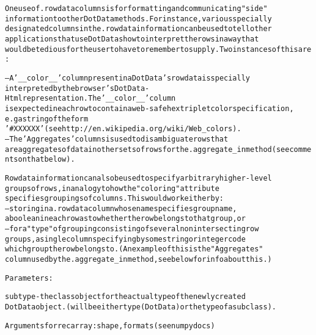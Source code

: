 \begin{boxedminipage}{\funcwidth}
\begin{alltt}
     One use of .rowdata columns is for formatting and communicating "side" 
     information to other DotData methods. For instance, various specially 
     designated columns in the .rowdata information can be used to tell other 
     applications that use DotDatas how to interpret the rows in a way that
     would be tedious for the user to have to remember to supply. Two instances of this are:
             
     -- A '\_\_color\_\_' column present in a DotData's rowdata is specially 
     interpreted by the browser's DotData- Html representation. The '\_\_color\_\_' column
     is expected in each row to contain a web-safe hex triplet color specification, 
     e.g a string of the form
             '\#XXXXXX' (see http://en.wikipedia.org/wiki/Web\_colors).  
     -- The 'Aggregates' columns is used to disambiguate rows that 
     are aggregates of data in other sets of rows for the .aggregate\_in method (see comments on that below). 
     
     Rowdata information can also be used to specify arbitrary higher-level 
     groups of rows, in analogy to how the "coloring" attribute 
     specifies groupings of columns.   This would work either by: 
             -- storing in a .rowdata column whose name specifies group name,
                     a boolean in each row as to whether the row belongs to that group, or
             -- for a "type" of grouping consisting of several nonintersecting row 
                     groups, a single column specifying by some string or integer code 
                     which group the row belongs to.  (An example of this is the "Aggregates"
                     column used by the .aggregate\_in method, see below for info about this.) 

     Parameters:

       subtype - the class object for the actual type of the newly created 
       DotData object.  (will be either type(DotData) or the type of a subclass).


        Arguments for recarray: shape, formats (see numpy docs)
        
     
\end{alltt}

\setlength{\parskip}{1ex}
    \end{boxedminipage}

    \label{Classes:DotData:DotData:extract}

